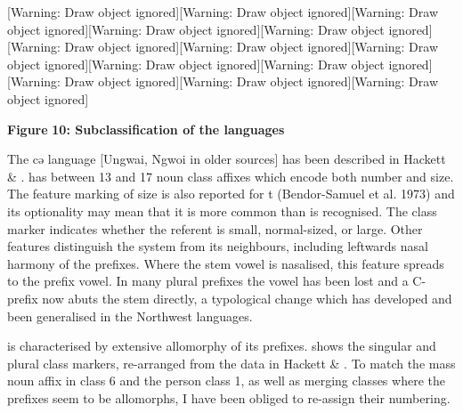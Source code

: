 \documentclass[output=paper]{langsci/langscibook}
\begin{document}
[Warning: Draw object ignored][Warning: Draw object ignored][Warning: Draw object ignored][Warning: Draw object ignored][Warning: Draw object ignored][Warning: Draw object ignored][Warning: Draw object ignored][Warning: Draw object ignored][Warning: Draw object ignored][Warning: Draw object ignored][Warning: Draw object ignored][Warning: Draw object ignored][Warning: Draw object ignored]  
 


\textbf{{Figure} }\textbf{{10: Subclassification of the  languages}}



\subsubsectionryə [=Ngwoi{]}]{3.6.2 \ili{Hungwəryə} [=Ngwoi]}

The cə language [Ungwai, Ngwoi in older sources] has been described in Hackett \& \citet{Davey2009}.  has between 13 and 17 noun class affixes which encode both number and size. The feature marking of size is also reported for t (Bendor-Samuel et al. 1973) and its optionality may mean that it is more common than is recognised. The class marker indicates whether the referent is small, normal-sized, or large. Other features distinguish the  system from its neighbours, including leftwards nasal harmony of the prefixes. Where the stem vowel is nasalised, this feature spreads to the prefix vowel. In many plural prefixes the vowel has been lost and a C- prefix now abuts the stem directly, a typological change which has developed and been generalised in the Northwest  languages.

 is characterised by extensive allomorphy of its prefixes.  shows the singular and plural class markers, re-arranged from the data in Hackett \& \citet{Davey2009}. To match the mass noun affix in class 6 and the person class 1, as well as merging classes where the prefixes seem to be allomorphs, I have been obliged to re-assign their numbering. 
\end{document}
